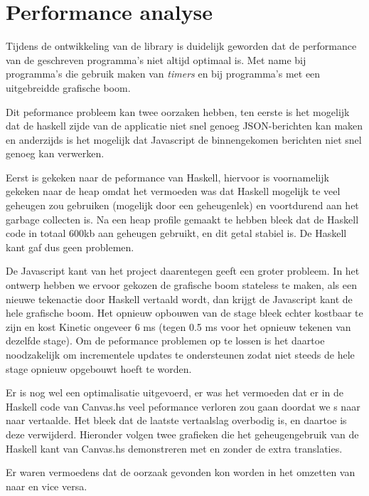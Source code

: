 \section{Performance analyse}
Tijdens de ontwikkeling van de library is duidelijk geworden dat de performance van de geschreven programma's niet altijd optimaal is. Met name bij programma's die gebruik maken van \emph{timers} en bij programma's met een uitgebreidde grafische boom.

Dit peformance probleem kan twee oorzaken hebben, ten eerste is het mogelijk dat de haskell zijde van de applicatie niet snel genoeg JSON-berichten kan maken en anderzijds is het mogelijk dat Javascript de binnengekomen berichten niet snel genoeg kan verwerken.

Eerst is gekeken naar de peformance van Haskell, hiervoor is voornamelijk gekeken naar de heap omdat het vermoeden was dat Haskell mogelijk te veel geheugen zou gebruiken (mogelijk door een geheugenlek) en voortdurend aan het garbage collecten is. Na een heap profile gemaakt te hebben bleek dat de Haskell code in totaal 600kb aan geheugen gebruikt, en dit getal stabiel is. De Haskell kant gaf dus geen problemen.

De Javascript kant van het project daarentegen geeft een groter probleem. In het ontwerp hebben we ervoor gekozen de grafische boom stateless te maken, als een nieuwe tekenactie door Haskell vertaald wordt, dan krijgt de Javascript kant de hele grafische boom. Het opnieuw  opbouwen van de stage bleek echter kostbaar te zijn en kost Kinetic ongeveer 6 ms (tegen 0.5 ms voor het opnieuw tekenen van dezelfde stage). Om de peformance problemen op te lossen is het daartoe noodzakelijk om incrementele updates te ondersteunen zodat niet steeds de hele stage opnieuw opgebouwt hoeft te worden.

Er is nog wel een optimalisatie uitgevoerd, er was het vermoeden dat er in de Haskell code van Canvas.hs veel peformance verloren zou gaan doordat we s naar  naar  vertaalde. Het bleek dat de laatste vertaalslag overbodig is, en daartoe is deze verwijderd. Hieronder volgen twee grafieken die het geheugengebruik van de Haskell kant van Canvas.hs demonstreren met en zonder de extra translaties.

Er waren vermoedens dat de oorzaak gevonden kon worden in het omzetten van  naar  en vice versa.

